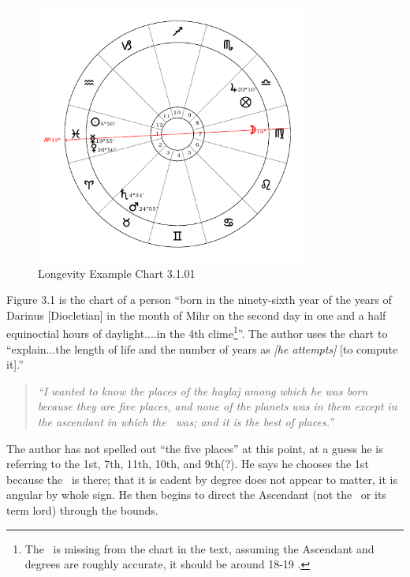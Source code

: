 \vspace{-1em}
\begin{figure}[H]
\centering
\includegraphics[width=0.8\textwidth]{charts/3_1_01}
\vspace{-1em}
\caption{Longevity Example Chart 3.1.01}
\end{figure}

Figure 3.1 is the chart of a person ``born in the ninety-sixth year of the years of Darinus [Diocletian] in the month of Mihr on the second day in one and a half equinoctial hours of daylight....in the 4th clime\footnote{The \Moon\, is missing from the chart in the text, assuming the Ascendant and \Sun\, degrees are roughly accurate, it should be around 18-19 \Virgo.}''. The author uses the chart to ``explain...the length of life and the number of years as \textsl{[he attempts]} [to compute it].''

\begin{quote}
\textsl{``I  wanted to know the places of the haylaj among which he was born because they are five places, and none of the planets was in them except in the ascendant in which the \Sun\, was; and it is the best of places.''}
\end{quote}

The author has not spelled out ``the five places'' at this point, at a guess he is referring to the 1st, 7th, 11th, 10th, and 9th(?).  He says he chooses the 1st because the \Sun\, is there; that it is cadent by degree does not appear to matter, it is angular by whole sign. He then begins to direct the Ascendant (not the \Sun\, or its term lord) through the bounds.

